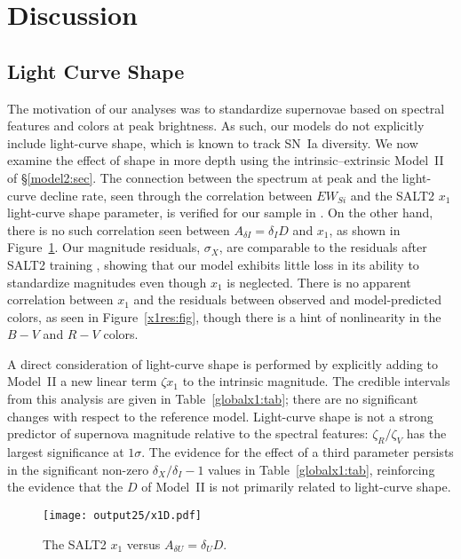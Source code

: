\documentclass{aastex61}   	%
\begin{document}
\section{Discussion}
\label{discussion:sec}

\subsection{Light Curve Shape}
\label{shape:sec}
The motivation of our analyses was to standardize supernovae based on spectral features and colors at peak brightness.
As such, our models do not explicitly include light-curve shape, which is known to track SN~Ia diversity.
We now examine the effect of shape in more depth using the intrinsic--extrinsic Model~II of \S\ref{model2:sec}.
The connection between the spectrum at peak and the light-curve decline rate, seen through
the correlation between $EW_{Si}$ and the SALT2 $x_1$ light-curve shape parameter, is verified
for our sample in \citet{2017Chotard}.
On the other hand, there is no such correlation seen between $A_{\delta I} = \delta_I D$ and $x_1$, as shown in Figure~\ref{x1:fig}. 
Our magnitude residuals, $\sigma_X$, are comparable to the residuals after SALT2 training
\citep{2010A&A...523A...7G}, showing that our model exhibits little loss in its ability to standardize
magnitudes even though $x_1$ is neglected.
There is no apparent correlation
between $x_1$ and the residuals between observed and model-predicted colors, as seen in
Figure~\ref{x1res:fig},
though there is a hint of nonlinearity in the $B-V$ and $R-V$ colors.

A direct consideration of light-curve shape is
performed by explicitly adding to Model~II a new linear term $\zeta x_1$ to the 
intrinsic magnitude. The credible intervals
from this analysis are given in Table~\ref{globalx1:tab}; there are no significant changes with respect to the reference model. 
Light-curve shape is not a strong predictor of supernova magnitude relative to the spectral features: $\zeta_R/\zeta_V$
has the largest significance  at $1\sigma$.
The evidence for the effect of a third parameter persists in the significant  non-zero  $\delta_X/\delta_I-1$ values
in Table~\ref{globalx1:tab}, reinforcing the evidence that the $D$ of Model~II is not primarily related to light-curve shape.

\begin{figure}[htbp] %
   \centering
   \texttt{[image: output25/x1D.pdf]}
    \caption{The SALT2 $x_1$ versus $A_{\delta U}  = \delta_U D$.
   \label{x1:fig}}
\end{figure}
\end{document}
